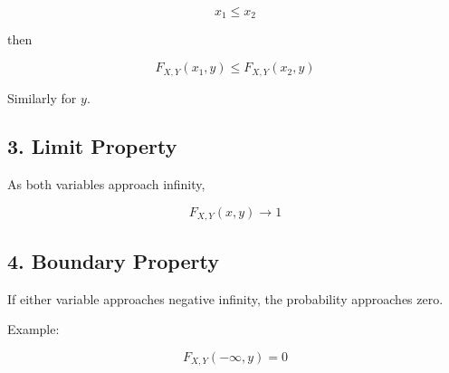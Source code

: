 \documentclass[12pt]{article}
\begin{document}
\[
x_1 \le x_2
\]

then

\[
F_{X,Y}(x_1,y) \le F_{X,Y}(x_2,y)
\]

Similarly for $y$.

\subsection*{3. Limit Property}

As both variables approach infinity,

\[
F_{X,Y}(x,y) \rightarrow 1
\]

\subsection*{4. Boundary Property}

If either variable approaches negative infinity, the probability approaches zero.

Example:

\[
F_{X,Y}(-\infty, y) = 0
\]
\end{document}
